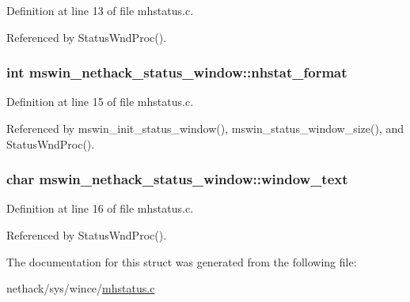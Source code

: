 Definition at line 13 of file mhstatus.\+c.



Referenced by Status\+Wnd\+Proc().

\hypertarget{structmswin__nethack__status__window_a09fc0b982f6cded2ee8cc2ab5771f473}{
\subsubsection[{nhstat\+\_\+format}]{\setlength{\rightskip}{0pt plus 5cm}int mswin\+\_\+nethack\+\_\+status\+\_\+window\+::nhstat\+\_\+format}}\label{structmswin__nethack__status__window_a09fc0b982f6cded2ee8cc2ab5771f473}


Definition at line 15 of file mhstatus.\+c.



Referenced by mswin\+\_\+init\+\_\+status\+\_\+window(), mswin\+\_\+status\+\_\+window\+\_\+size(), and Status\+Wnd\+Proc().

\hypertarget{structmswin__nethack__status__window_afc39505634916f0cd93ca59544203033}{
\subsubsection[{window\+\_\+text}]{\setlength{\rightskip}{0pt plus 5cm}char mswin\+\_\+nethack\+\_\+status\+\_\+window\+::window\+\_\+text}}\label{structmswin__nethack__status__window_afc39505634916f0cd93ca59544203033}


Definition at line 16 of file mhstatus.\+c.



Referenced by Status\+Wnd\+Proc().



The documentation for this struct was generated from the following file\+:\begin{DoxyCompactItemize}
\item 
nethack/sys/wince/\hyperlink{sys_2wince_2mhstatus_8c}{mhstatus.\+c}\end{DoxyCompactItemize}
